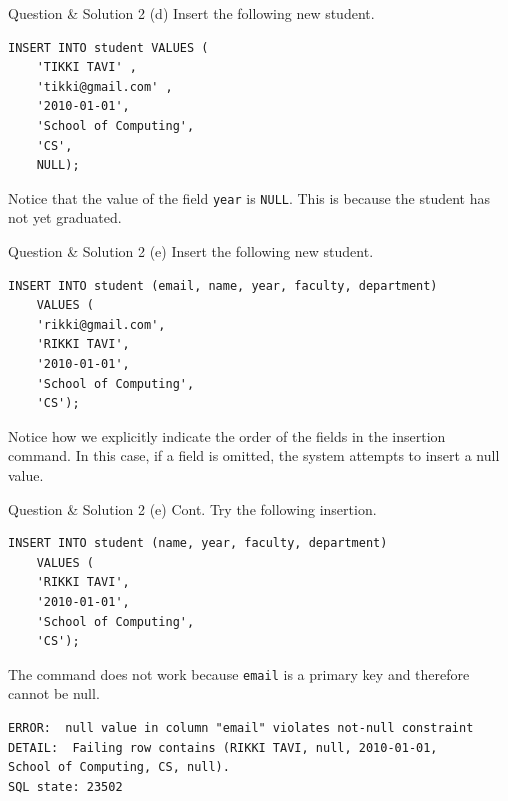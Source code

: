 \begin{frame}[fragile]{Question \& Solution 2 (d)}
Insert the following new student.

\begin{lstlisting}
INSERT INTO student VALUES (
	'TIKKI TAVI' , 
	'tikki@gmail.com' , 
	'2010-01-01', 
	'School of Computing', 
	'CS', 
	NULL);
\end{lstlisting}

Notice that the value of the field \texttt{year} is \texttt{NULL}. This is because the student has not yet graduated.
\end{frame}

\begin{frame}[fragile]{Question \& Solution 2 (e)}
Insert the following new student.

\begin{lstlisting}
INSERT INTO student (email, name, year, faculty, department)
	VALUES (
	'rikki@gmail.com', 
	'RIKKI TAVI', 
	'2010-01-01',
	'School of Computing', 
	'CS');
\end{lstlisting}

Notice how we explicitly indicate the order of the fields in the insertion command. In this case, if a field is omitted, the system attempts to insert a null value.

\end{frame}

\begin{frame}[fragile]{Question \& Solution 2 (e) Cont.}
Try the following insertion.
\begin{lstlisting}
INSERT INTO student (name, year, faculty, department) 
	VALUES (
	'RIKKI TAVI',  
	'2010-01-01', 
	'School of Computing', 
	'CS');
\end{lstlisting}
The command does not work because \texttt{email} is a primary key and therefore cannot be null.

\begin{lstlisting}[style=error]
ERROR:  null value in column "email" violates not-null constraint
DETAIL:  Failing row contains (RIKKI TAVI, null, 2010-01-01, 
School of Computing, CS, null).
SQL state: 23502
\end{lstlisting}
\end{frame}


